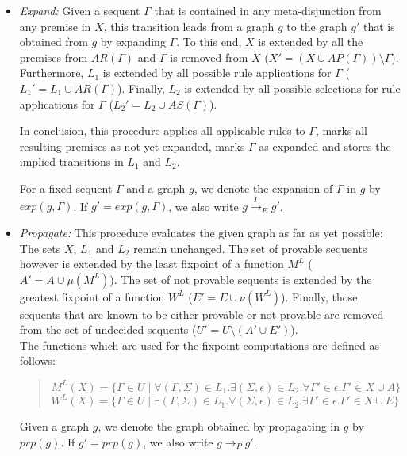 \documentclass{llncs}
\begin{document}
\begin{itemize}
\item \emph{Expand:} Given a sequent $\Gamma$ that is contained in any meta-disjunction
from any premise in $X$, this transition leads from a graph $g$ to the graph $g'$ that is
obtained from $g$ by expanding $\Gamma$. To this end, $X$ is extended by all the premises
from $AR(\Gamma)$ and $\Gamma$ is removed from $X$ ($X'=(X\cup AP(\Gamma))\setminus \Gamma$).
Furthermore, $L_1$ is extended by all possible rule applications for $\Gamma$
($L_1'=L_1 \cup AR(\Gamma)$). Finally, $L_2$ is extended by all possible selections
for rule applications for $\Gamma$ ($L_2'=L_2\cup AS(\Gamma)$).

In conclusion, this procedure applies all applicable rules to $\Gamma$, marks all resulting 
premises as not yet expanded, marks $\Gamma$ as expanded and stores the implied transitions in
$L_1$ and $L_2$.

For a fixed sequent $\Gamma$ and a graph $g$, we denote the expansion of $\Gamma$ in $g$ by
$exp(g,\Gamma)$. If $g'=exp(g,\Gamma)$, we also write $g\stackrel{\Gamma}\rightarrow_E g'$.

\item \emph{Propagate:} This procedure evaluates the given graph as far as yet possible: The sets
$X$, $L_1$ and $L_2$ remain unchanged. The set of provable sequents however is extended by the least
fixpoint of a function $M^L$ ($A'=A\cup\mu(M^L)$). The set of not provable sequents is extended by the
greatest fixpoint of a function $W^L$ ($E'=E\cup\nu(W^L)$). Finally, those sequents that are known to be
either provable or not provable are removed from the set of undecided sequents
($U'=U\setminus(A'\cup E')$).\\

The functions which are used for the fixpoint computations are defined as follows:\\

\begin{quote}
$M^L(X)=\{\Gamma\in U\mid\forall(\Gamma,\Sigma)\in L_1.\exists (\Sigma,\epsilon)\in L_2.\forall \Gamma'\in\epsilon. \Gamma'\in X\cup A\}$\\
$W^L(X)=\{\Gamma\in U\mid\exists(\Gamma,\Sigma)\in L_1.\forall (\Sigma,\epsilon)\in L_2.\exists \Gamma'\in\epsilon. \Gamma'\in X\cup E\}$\\
\end{quote}

Given a graph $g$, we denote the graph obtained by propagating in $g$ by
$prp(g)$. If $g'=prp(g)$, we also write $g\rightarrow_P g'$.

\end{itemize}
\end{document}
